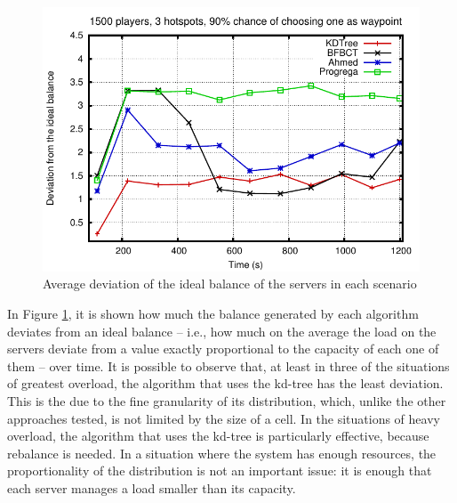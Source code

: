 \documentclass[acmjacm]{acmtrans2m}
\newcommand{\figurecaption}{Figure}
\begin{document}
\begin{figure}[!t]
	\includegraphics[width=0.49\linewidth]{data/1500players_prob90/usagedeviation}

	\caption{Average deviation of the ideal balance of the servers in each scenario}
	\label{fig:usagedeviation}
\end{figure}

In \figurecaption{} \ref{fig:usagedeviation}, it is shown how much the balance generated by each algorithm deviates from an ideal balance -- i.e., how much on the average the load on the servers deviate from a value exactly proportional to the capacity of each one of them -- over time. It is possible to observe that, at least in three of the situations of greatest overload, the algorithm that uses the kd-tree has the least deviation. This is the due to the fine granularity of its distribution, which, unlike the other approaches tested, is not limited by the size of a cell. In the situations of heavy overload, the algorithm that uses the kd-tree is particularly effective, because rebalance is needed. In a situation where the system has enough resources, the proportionality of the distribution is not an important issue: it is enough that each server manages a load smaller than its capacity.
\end{document}
